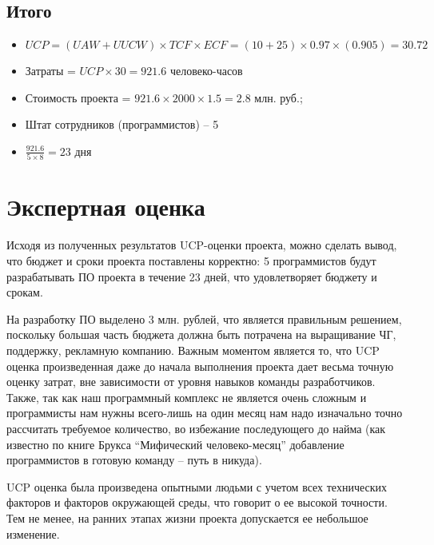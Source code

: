 \documentclass[a4paper,8pt]{article}
\begin{document}
\subsection*{Итого}


    \begin{itemize}
        \item $UCP = (UAW + UUCW) \times TCF \times ECF = (10 + 25) \times 0.97 \times (0.905) = 30.72$
        \item Затраты = $UCP \times 30 = 921.6$ человеко-часов
        \item Стоимость проекта = $921.6 \times 2000 \times 1.5 = 2.8$ млн. руб.;
        \item Штат сотрудников (программистов) -- 5
        \item $\frac{921.6}{5 \times 8} = 23$ дня
    \end{itemize}

\section*{Экспертная оценка}

    Исходя из полученных результатов UCP-оценки проекта, можно сделать вывод, что бюджет и сроки проекта поставлены корректно: 5 программистов будут разрабатывать ПО проекта в течение 23 дней, что удовлетворяет бюджету и срокам.

    На разработку ПО выделено 3 млн. рублей, что является правильным решением, поскольку большая часть бюджета должна быть потрачена на выращивание ЧГ, поддержку, рекламную компанию. Важным моментом является то, что UCP оценка произведенная даже до начала выполнения проекта дает весьма точную оценку затрат, вне зависимости от уровня навыков команды разработчиков. Также, так как наш программный комплекс не является очень сложным и программисты нам нужны всего-лишь на один месяц нам надо изначально точно рассчитать требуемое количество, во избежание последующего до найма (как известно по книге Брукса ``Мифический человеко-месяц'' добавление программистов в готовую команду -- путь в никуда). 

    UCP оценка была произведена опытными людьми с учетом всех технических факторов и факторов окружающей среды, что говорит о ее высокой точности. Тем не менее, на ранних этапах жизни проекта допускается ее небольшое изменение.
\end{document}
